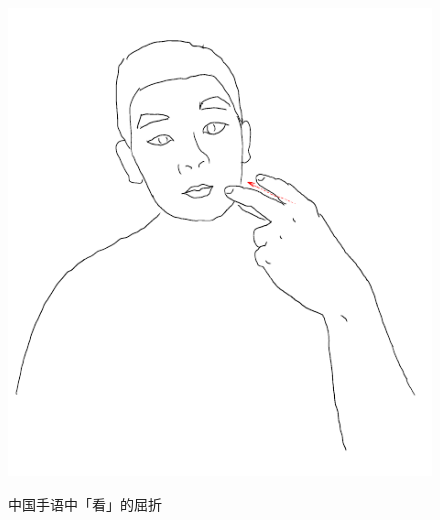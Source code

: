 \documentclass[12pt, a4paper, oneside]{ctexart}
\begin{document}
\begin{figure}[H]
{\begin{minipage}[t]{0.33\linewidth}
    \includegraphics[width=\linewidth]{fig/youlook.pdf}
    \end{minipage}%
    \label{fig:youlook}%
    }%
    \caption{中国手语中「看」的屈折}
    \label{fig:中国手语中「看」的屈折}
\end{figure}
\end{document}
